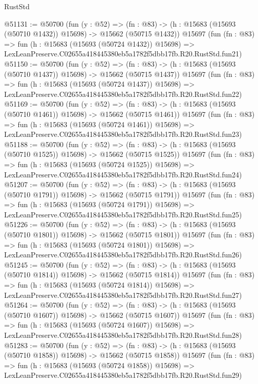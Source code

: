 \begin{lexlean}{RustStd}
\begin{coremodule}
@51131 := @50700
    (fun (y : @52) =>
    (fn : @83) -> (h : @15683 (@15693 (@50710 @1432)) @15698) -> @15662 (@50715 @1432))
    @15697
    (fun (fn : @83) =>
    fun (h : @15683 (@15693 (@50724 @1432)) @15698) =>
    LexLeanPreserve.C02655a418445380eb5a1782f5dbb17fb.R20.RustStd.fun21)
@51150 := @50700
    (fun (y : @52) =>
    (fn : @83) -> (h : @15683 (@15693 (@50710 @1437)) @15698) -> @15662 (@50715 @1437))
    @15697
    (fun (fn : @83) =>
    fun (h : @15683 (@15693 (@50724 @1437)) @15698) =>
    LexLeanPreserve.C02655a418445380eb5a1782f5dbb17fb.R20.RustStd.fun22)
@51169 := @50700
    (fun (y : @52) =>
    (fn : @83) -> (h : @15683 (@15693 (@50710 @1461)) @15698) -> @15662 (@50715 @1461))
    @15697
    (fun (fn : @83) =>
    fun (h : @15683 (@15693 (@50724 @1461)) @15698) =>
    LexLeanPreserve.C02655a418445380eb5a1782f5dbb17fb.R20.RustStd.fun23)
@51188 := @50700
    (fun (y : @52) =>
    (fn : @83) -> (h : @15683 (@15693 (@50710 @1525)) @15698) -> @15662 (@50715 @1525))
    @15697
    (fun (fn : @83) =>
    fun (h : @15683 (@15693 (@50724 @1525)) @15698) =>
    LexLeanPreserve.C02655a418445380eb5a1782f5dbb17fb.R20.RustStd.fun24)
@51207 := @50700
    (fun (y : @52) =>
    (fn : @83) -> (h : @15683 (@15693 (@50710 @1791)) @15698) -> @15662 (@50715 @1791))
    @15697
    (fun (fn : @83) =>
    fun (h : @15683 (@15693 (@50724 @1791)) @15698) =>
    LexLeanPreserve.C02655a418445380eb5a1782f5dbb17fb.R20.RustStd.fun25)
@51226 := @50700
    (fun (y : @52) =>
    (fn : @83) -> (h : @15683 (@15693 (@50710 @1801)) @15698) -> @15662 (@50715 @1801))
    @15697
    (fun (fn : @83) =>
    fun (h : @15683 (@15693 (@50724 @1801)) @15698) =>
    LexLeanPreserve.C02655a418445380eb5a1782f5dbb17fb.R20.RustStd.fun26)
@51245 := @50700
    (fun (y : @52) =>
    (fn : @83) -> (h : @15683 (@15693 (@50710 @1814)) @15698) -> @15662 (@50715 @1814))
    @15697
    (fun (fn : @83) =>
    fun (h : @15683 (@15693 (@50724 @1814)) @15698) =>
    LexLeanPreserve.C02655a418445380eb5a1782f5dbb17fb.R20.RustStd.fun27)
@51264 := @50700
    (fun (y : @52) =>
    (fn : @83) -> (h : @15683 (@15693 (@50710 @1607)) @15698) -> @15662 (@50715 @1607))
    @15697
    (fun (fn : @83) =>
    fun (h : @15683 (@15693 (@50724 @1607)) @15698) =>
    LexLeanPreserve.C02655a418445380eb5a1782f5dbb17fb.R20.RustStd.fun28)
@51283 := @50700
    (fun (y : @52) =>
    (fn : @83) -> (h : @15683 (@15693 (@50710 @1858)) @15698) -> @15662 (@50715 @1858))
    @15697
    (fun (fn : @83) =>
    fun (h : @15683 (@15693 (@50724 @1858)) @15698) =>
    LexLeanPreserve.C02655a418445380eb5a1782f5dbb17fb.R20.RustStd.fun29)

\end{coremodule}
\end{lexlean}
